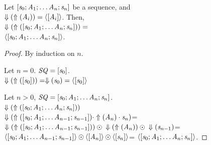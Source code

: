 \documentclass[numbers]{sigplanconf}
\begin{document}
\begin{lemma}
\label{lem:sequence-rx}
Let $[\mathit{s}_0;\mathit{A}_1;
\ldots\mathit{A}_n;\mathit{s}_n]$ be a sequence,
and\\
$\Downarrow(\Uparrow(\mathit{A}_i))=\langle[\mathit{A}_i]\rangle$.
Then,\\$\Downarrow(\Uparrow([\mathit{s}_0;\mathit{A}_1;
\ldots\mathit{A}_n;\mathit{s}_n]))=$\\
$\langle[\mathit{s}_0;\mathit{A}_1;
\ldots\mathit{A}_n;\mathit{s}_n]\rangle$.
\end{lemma}
\begin{proof}
By induction on $n$.

Let $n=0$.
$\mathit{SQ}=[\mathit{s}_0]$.\\
$\Downarrow(\Uparrow([\mathit{s}_0]))=
\Downarrow(\mathit{s}_0)=\langle[\mathit{s}_0]\rangle$

Let $n>0$,
$\mathit{SQ}=[\mathit{s}_0;\mathit{A}_1;
\ldots\mathit{A}_n;\mathit{s}_n]$.\\
$\Downarrow(\Uparrow([\mathit{s}_0;\mathit{A}_1;
\ldots\mathit{A}_n;\mathit{s}_n]))$\\
$\Downarrow(\Uparrow([\mathit{s}_0;\mathit{A}_1;
\ldots\mathit{A}_{n-1};\mathit{s}_{n-1}])\cdot\Uparrow(\mathit{A}_n)
\cdot\mathit{s}_n)$=\\
$\Downarrow(\Uparrow([\mathit{s}_0;\mathit{A}_1;
\ldots\mathit{A}_{n-1};\mathit{s}_{n-1}]))
\odot\\
\Downarrow(\Uparrow(\mathit{A}_n))
\odot\\
\Downarrow(\mathit{s}_{n-1})$=
$\langle[\mathit{s}_0;\mathit{A}_1;
\ldots\mathit{A}_{n-1};\mathit{s}_{n-1}]\rangle
\odot\\
\langle[\mathit{A}_n]\rangle
\odot
\langle[\mathit{s}_n]\rangle$=
$\langle[\mathit{s}_0;\mathit{A}_1;
\ldots\mathit{A}_n;\mathit{s}_n]\rangle$.
\end{proof}
\end{document}
